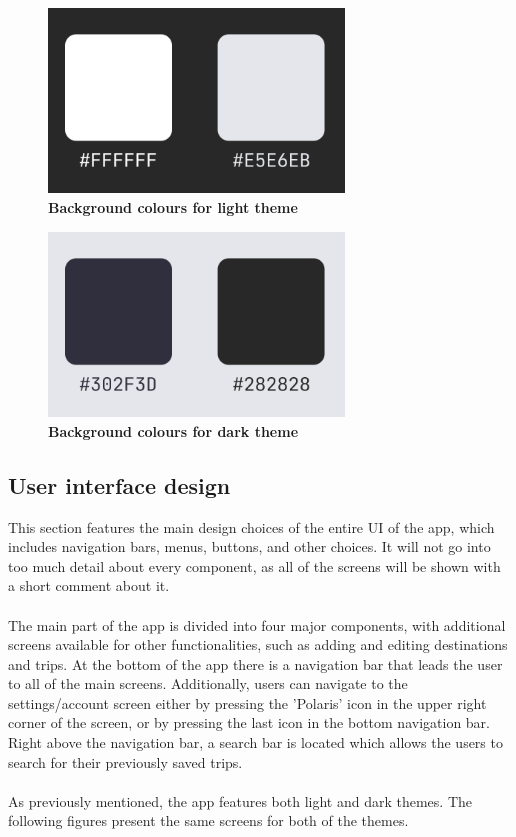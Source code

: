 \begin{figure}[!htb]
\centering
\includegraphics[width=0.7\textwidth]{../Images/UI/BackgroundLight.png}
\caption{\label{fig:dbapiuser}\textbf{Background colours for light theme}}
\end{figure} 

\begin{figure}[!htb]
\centering
\includegraphics[width=0.7\textwidth]{../Images/UI/BackgroundDark.png}
\caption{\label{fig:dbapiuser}\textbf{Background colours for dark theme}}
\end{figure} 
\newpage

\subsection{User interface design}

\hspace{\parindent}This section features the main design choices of the entire UI of the app, which includes navigation bars, menus, buttons, and other choices. It will not go into too much detail about every component, as all of the screens will be shown with a short comment about it. \\ \\
The main part of the app is divided into four major components, with additional screens available for other functionalities, such as adding and editing destinations and trips. At the bottom of the app there is a navigation bar that leads the user to all of the main screens. Additionally, users can navigate to the settings/account screen either by pressing the 'Polaris' icon in the upper right corner of the screen, or by pressing the last icon in the bottom navigation bar. Right above the navigation bar, a search bar is located which allows the users to search for their previously saved trips.\\ \\
As previously mentioned, the app features both light and dark themes. The following figures present the same screens for both of the themes.\\

